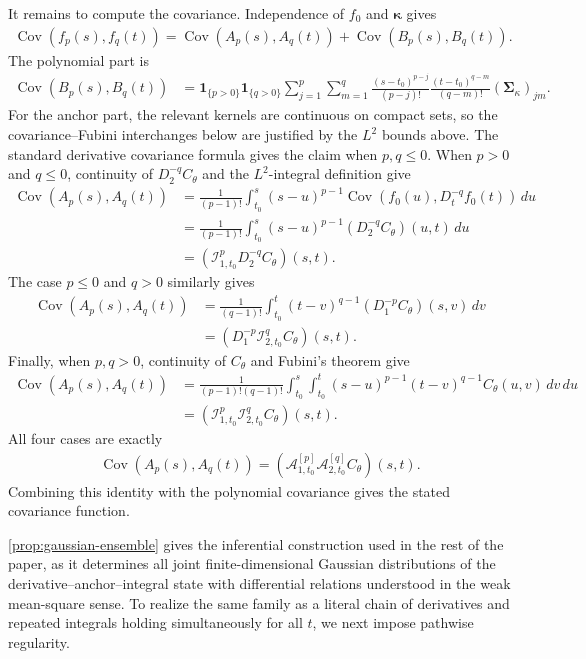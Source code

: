 \documentclass[11pt,a4paper]{article}
\theoremstyle{definition}
\theoremstyle{remark}
\DeclareMathOperator{\Cov}{Cov}
\begin{document}
\begin{mainproof}
It remains to compute the covariance. Independence of \(f_0\) and \(\boldsymbol\kappa\) gives
\begin{align*}
\Cov(f_p(s),f_q(t))=\Cov(A_p(s),A_q(t))+\Cov(B_p(s),B_q(t)).
\end{align*}
The polynomial part is
\begin{align*}
\Cov(B_p(s),B_q(t))
&=
\mathbf{1}_{\{p>0\}}\mathbf{1}_{\{q>0\}}
\sum_{j=1}^{p}\sum_{m=1}^{q}
\frac{(s-t_0)^{p-j}}{(p-j)!}
\frac{(t-t_0)^{q-m}}{(q-m)!}
(\boldsymbol\Sigma_\kappa)_{jm}.
\end{align*}
For the anchor part, the relevant kernels are continuous on compact sets, so the covariance--Fubini interchanges below are justified by the \(L^2\) bounds above. The standard derivative covariance formula gives the claim when \(p,q\le0\). When \(p>0\) and \(q\le0\), continuity of \(D_2^{-q}C_\theta\) and the \(L^2\)-integral definition give
\begin{align*}
\Cov(A_p(s),A_q(t))
&=\frac{1}{(p-1)!}\int_{t_0}^s (s-u)^{p-1}
\Cov(f_0(u),D_t^{-q}f_0(t))\,du\\
&=\frac{1}{(p-1)!}\int_{t_0}^s (s-u)^{p-1}(D_2^{-q}C_\theta)(u,t)\,du\\
&=(\mathcal I_{1,t_0}^pD_2^{-q}C_\theta)(s,t).
\end{align*}
The case \(p\le0\) and \(q>0\) similarly gives
\begin{align*}
\Cov(A_p(s),A_q(t))
&=\frac{1}{(q-1)!}\int_{t_0}^t (t-v)^{q-1}(D_1^{-p}C_\theta)(s,v)\,dv\\
&=(D_1^{-p}\mathcal I_{2,t_0}^qC_\theta)(s,t).
\end{align*}
Finally, when \(p,q>0\), continuity of \(C_\theta\) and Fubini's theorem give
\begin{align*}
\Cov(A_p(s),A_q(t))
&=\frac{1}{(p-1)!(q-1)!}
\int_{t_0}^s\int_{t_0}^t
(s-u)^{p-1}(t-v)^{q-1}C_\theta(u,v)\,dv\,du\\
&=(\mathcal I_{1,t_0}^p\mathcal I_{2,t_0}^qC_\theta)(s,t).
\end{align*}
All four cases are exactly
\begin{align*}
\Cov(A_p(s),A_q(t))=(\mathcal A_{1,t_0}^{[p]}\mathcal A_{2,t_0}^{[q]}C_\theta)(s,t).
\end{align*}
Combining this identity with the polynomial covariance gives the stated covariance function.
\end{mainproof}


\cref{prop:gaussian-ensemble} gives the inferential construction used in the rest of the paper, as it determines all joint finite-dimensional Gaussian distributions of the derivative--anchor--integral state with differential relations understood in the weak mean-square sense. To realize the same family as a literal chain of derivatives and repeated integrals holding simultaneously for all \(t\), we next impose pathwise regularity.
\end{document}
